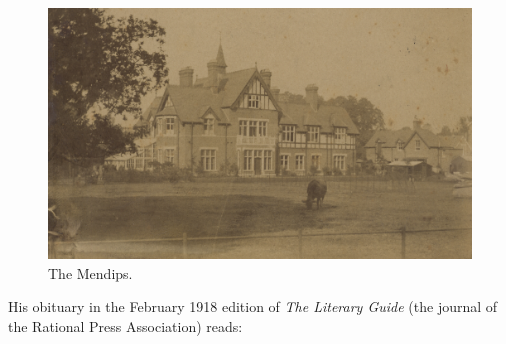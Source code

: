 \begin{figure}
 \centering
 \includegraphics{photos/Mendips.png}
 \caption{The Mendips.}
\end{figure}

His obituary in the February 1918 edition of \emph{The Literary Guide} (the journal of the Rational Press Association) reads:

